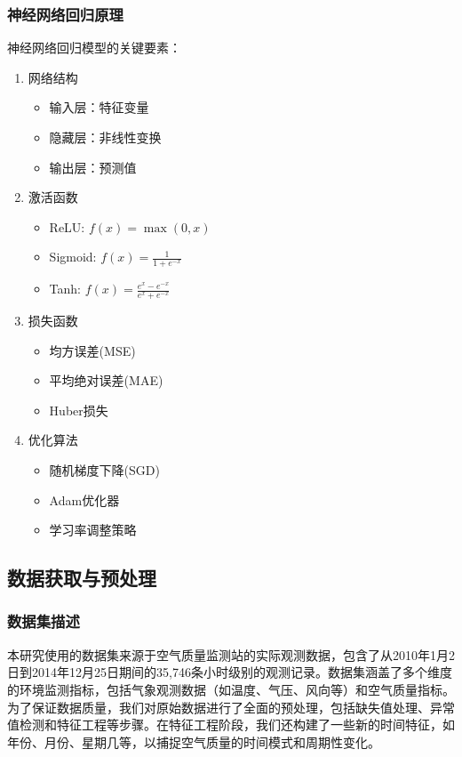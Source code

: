 \subsubsection{神经网络回归原理}
神经网络回归模型的关键要素：
\begin{enumerate}
    \item 网络结构
    \begin{itemize}
        \item 输入层：特征变量
        \item 隐藏层：非线性变换
        \item 输出层：预测值
    \end{itemize}
    
    \item 激活函数
    \begin{itemize}
        \item ReLU: $f(x) = \max(0,x)$
        \item Sigmoid: $f(x) = \frac{1}{1+e^{-x}}$
        \item Tanh: $f(x) = \frac{e^x-e^{-x}}{e^x+e^{-x}}$
    \end{itemize}
    
    \item 损失函数
    \begin{itemize}
        \item 均方误差(MSE)
        \item 平均绝对误差(MAE)
        \item Huber损失
    \end{itemize}
    
    \item 优化算法
    \begin{itemize}
        \item 随机梯度下降(SGD)
        \item Adam优化器
        \item 学习率调整策略
    \end{itemize}
\end{enumerate}

\subsection{数据获取与预处理}
\subsubsection{数据集描述}
本研究使用的数据集来源于空气质量监测站的实际观测数据，包含了从2010年1月2日到2014年12月25日期间的35,746条小时级别的观测记录。数据集涵盖了多个维度的环境监测指标，包括气象观测数据（如温度、气压、风向等）和空气质量指标。为了保证数据质量，我们对原始数据进行了全面的预处理，包括缺失值处理、异常值检测和特征工程等步骤。在特征工程阶段，我们还构建了一些新的时间特征，如年份、月份、星期几等，以捕捉空气质量的时间模式和周期性变化。

